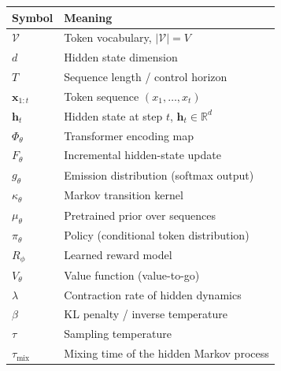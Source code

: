 \documentclass[11pt,a4paper]{article}
\theoremstyle{plain}
\theoremstyle{definition}
\theoremstyle{remark}
\newcommand{\R}{\mathbb{R}}
\newcommand{\vocab}{\mathcal{V}}
\begin{document}
\begin{center}
\renewcommand{\arraystretch}{1.3}
\begin{tabular}{@{}lp{10cm}@{}}
  \toprule
  \textbf{Symbol} & \textbf{Meaning} \\
  \midrule
  $\vocab$ & Token vocabulary, $|\vocab| = V$ \\
  $d$ & Hidden state dimension \\
  $T$ & Sequence length / control horizon \\
  $\bm{x}_{1:t}$ & Token sequence $(x_1, \ldots, x_t)$ \\
  $\bm{h}_t$ & Hidden state at step $t$, $\bm{h}_t \in \R^d$ \\
  $\Phi_\theta$ & Transformer encoding map \\
  $F_\theta$ & Incremental hidden-state update \\
  $g_\theta$ & Emission distribution (softmax output) \\
  $\kappa_\theta$ & Markov transition kernel \\
  $\mu_\theta$ & Pretrained prior over sequences \\
  $\pi_\theta$ & Policy (conditional token distribution) \\
  $R_\phi$ & Learned reward model \\
  $V_\theta$ & Value function (value-to-go) \\
  $\lambda$ & Contraction rate of hidden dynamics \\
  $\beta$ & KL penalty / inverse temperature \\
  $\tau$ & Sampling temperature \\
  $\tau_{\mathrm{mix}}$ & Mixing time of the hidden Markov process \\
  \bottomrule
\end{tabular}
\end{center}
\end{document}
